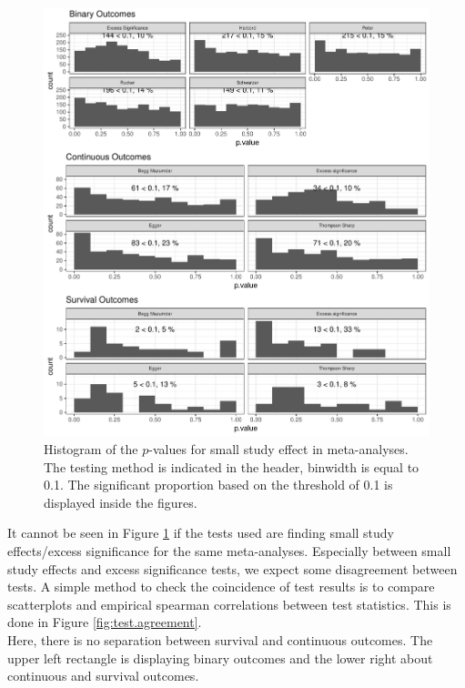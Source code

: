 \documentclass[11pt,a4paper,twoside]{book}\usepackage[]{graphicx}\usepackage[]{color}
\newenvironment{knitrout}{}{} %
\begin{document}
\begin{figure}
\begin{knitrout}
\color{fgcolor}

{\centering \includegraphics[width=\textwidth-3cm]{figure/ch03_figunnamed-chunk-10-1} 

}



\end{knitrout}
\caption{Histogram of the $p$-values for small study effect in meta-analyses. The testing method is indicated in the header, binwidth is equal to 0.1. The significant proportion based on the threshold of 0.1 is displayed inside the figures.}
\label{fig:test}
\end{figure}


It cannot be seen in Figure \ref{fig:test} if the tests used are finding small study effects/excess significance for the same meta-analyses. Especially between small study effects and excess significance tests, we expect some disagreement between tests. A simple method to check the coincidence of test results is to compare scatterplots and empirical spearman correlations between test statistics. This is done in Figure \ref{fig:test.agreement}. \\
Here, there is no separation between survival and continuous outcomes. The upper left rectangle is displaying binary outcomes and the lower right about continuous and survival outcomes.
\end{document}
